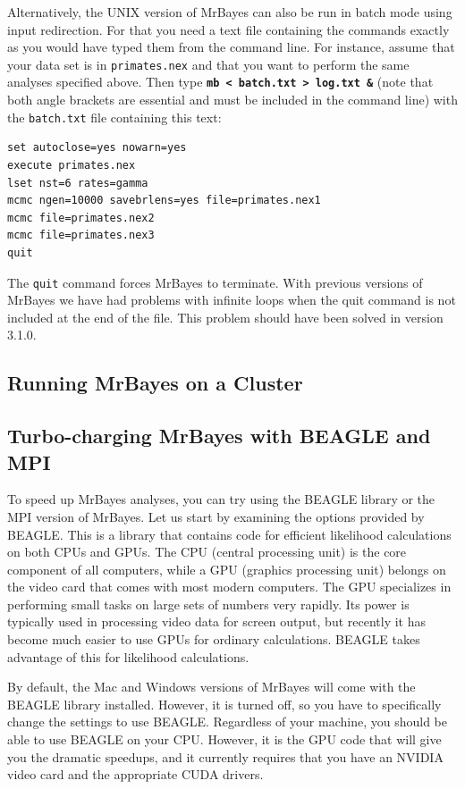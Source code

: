 \documentclass[12pt]{book}
\newcommand{\ttt}[1]{\texttt{#1} }
\newcommand{\tb}[1]{\texttt{\textbf{#1}} }
\begin{document}
Alternatively, the UNIX version of MrBayes can also be run in batch mode using input
redirection. For that you need a text file containing the commands exactly as you would
have typed them from the command line. For instance, assume that your data set is in
\ttt{primates.nex} and that you want to perform the same analyses specified above. Then
type \tb{mb < batch.txt > log.txt \&} (note that both angle brackets are essential and must
be included in the command line) with the \ttt{batch.txt} file containing this text:

\begin{singlespacing}
\small
\begin{verbatim}
set autoclose=yes nowarn=yes
execute primates.nex
lset nst=6 rates=gamma
mcmc ngen=10000 savebrlens=yes file=primates.nex1
mcmc file=primates.nex2
mcmc file=primates.nex3
quit
\end{verbatim}
\normalsize
\end{singlespacing}

The \ttt{quit} command forces MrBayes to terminate. With previous versions of MrBayes
we have had problems with infinite loops when the quit command is not included at the
end of the file. This problem should have been solved in version 3.1.0.

\subsection{Running MrBayes on a Cluster}


\subsection{Turbo-charging MrBayes with BEAGLE and MPI}
To speed up MrBayes analyses, you can try using the BEAGLE library or the MPI version of MrBayes. Let
us start by examining the options provided by BEAGLE. This is a library that contains code for efficient
likelihood calculations on both CPUs and GPUs. The CPU (central processing unit) is the core component
of all computers, while a GPU (graphics processing unit) belongs on the video card that comes with most
modern computers. The GPU specializes in performing small tasks on large sets of numbers very rapidly.
Its power is typically used in processing video data for screen output, but recently it has become much easier
to use GPUs for ordinary calculations. BEAGLE takes advantage of this for likelihood calculations.


By default, the Mac and Windows versions of MrBayes will come with the BEAGLE library installed. However,
it is turned off, so you have to specifically change the settings to use BEAGLE. Regardless of your machine,
you should be able to use BEAGLE on your CPU. However, it is the GPU code that will give you the dramatic
speedups, and it currently requires that you have an NVIDIA video card and the appropriate CUDA drivers.
\end{document}
